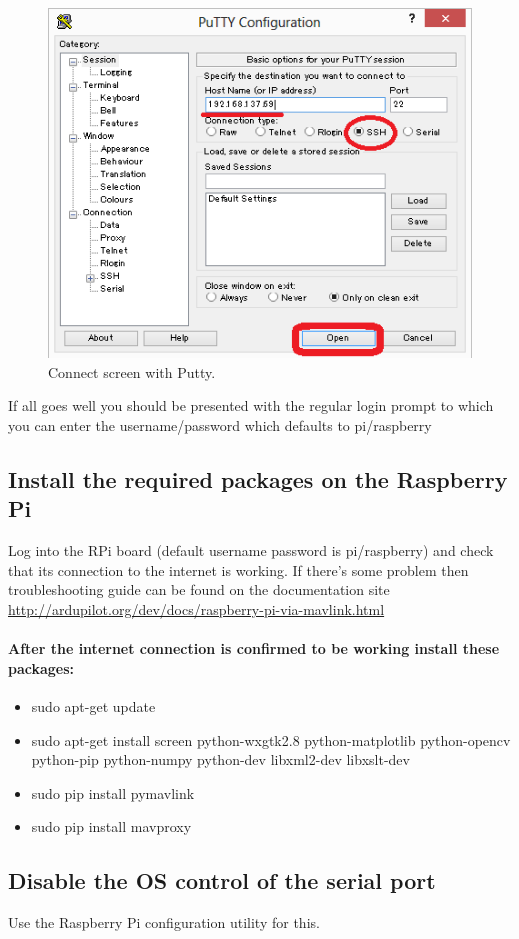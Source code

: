 \documentclass[11pt,a4paper]{article}
\begin{document}
\begin{itemize}
\begin{figure}[H]
		\includegraphics[scale=0.37]{putty}
	 	\caption{Connect screen with Putty.}
\end{figure}
	If all goes well you should be presented with the regular login prompt to which you can enter the username/password which defaults to pi/raspberry
	 \end{itemize}
	 \subsection{Install the required packages on the Raspberry Pi}
	 Log into the RPi board (default username password is pi/raspberry) and check that its connection to the internet is working. If there's some problem then troubleshooting guide can be found on the documentation site \url{http://ardupilot.org/dev/docs/raspberry-pi-via-mavlink.html}
	 \paragraph{After the internet connection is confirmed to be working install these packages:}
	 \begin{itemize}
	 	\item sudo apt-get update
	 	\item sudo apt-get install screen python-wxgtk2.8 python-matplotlib python-opencv python-pip python-numpy python-dev libxml2-dev libxslt-dev
	 	\item sudo pip install pymavlink
	 	\item sudo pip install mavproxy
	 \end{itemize}
	 \subsection{Disable the OS control of the serial port}
	 Use the Raspberry Pi configuration utility for this.
\end{document}
